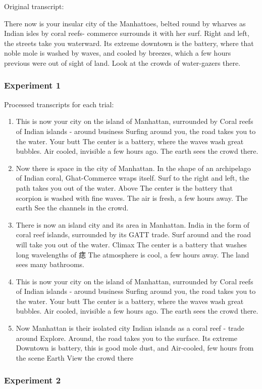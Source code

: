 \documentclass{article}
\begin{document}
Original transcript:

\begin{displayquote}
There now is your insular city of the Manhattoes, belted round by
wharves as Indian isles by coral reefs- commerce surrounds it with her
surf. Right and left, the streets take you waterward. Its extreme
downtown is the battery, where that noble mole is washed by waves, and
cooled by breezes, which a few hours previous were out of sight of
land. Look at the crowds of water-gazers there.
\end{displayquote}\subsubsection{Experiment 1}

Processed transcripts for each trial:

\begin{enumerate}
\item 
This is now your city on the island of Manhattan, surrounded by
Coral reefs of Indian islands - around business
Surfing around you, the road takes you to the water. Your butt
The center is a battery, where the waves wash great bubbles.
Air cooled, invisible a few hours ago.
The earth sees the crowd there.


\item 
Now there is space in the city of Manhattan.
In the shape of an archipelago of Indian coral, Ghat-Commerce wraps itself.
Surf to the right and left, the path takes you out of the water. Above
The center is the battery that scorpion is washed with fine waves.
The air is fresh, a few hours away.
The earth See the channels in the crowd.


\item 
There is now an island city and its area in Manhattan.
India in the form of coral reef islands, surrounded by its GATT trade.
Surf around and the road will take you out of the water. Climax
The center is a battery that washes long wavelengths of 痣
The atmosphere is cool, a few hours away.
The land sees many bathrooms.



\item 
This is now your city on the island of Manhattan, surrounded by
Coral reefs of Indian islands - around business
Surfing around you, the road takes you to the water. Your butt
The center is a battery, where the waves wash great bubbles.
Air cooled, invisible a few hours ago.
The earth sees the crowd there.



\item 
Now Manhattan is their isolated city
Indian islands as a coral reef - trade around
Explore. Around, the road takes you to the surface. Its extreme
Downtown is battery, this is good mole dust, and
Air-cooled, few hours from the scene
Earth View the crowd there

\end{enumerate}\subsubsection{Experiment 2}
\end{document}
